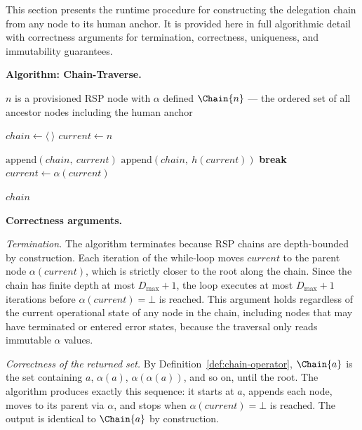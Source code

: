 This section presents the runtime procedure for constructing the delegation chain from any node to its human anchor. It is provided here in full algorithmic detail with correctness arguments for termination, correctness, uniqueness, and immutability guarantees.

\medskip
\noindent\textbf{Algorithm: Chain-Traverse.}

\begin{algorithm}
\caption{Chain-Traverse($n$) --- Build the delegation chain from node $n$ to the human anchor}
\label{alg:chain-traverse}
\begin{algorithmic}[1]
\REQUIRE $n$ is a provisioned RSP node with $\alpha$ defined
\ENSURE $\Chain{n}$ --- the ordered set of all ancestor nodes including the human anchor

\STATE $chain \leftarrow \langle\ \rangle$ 
\STATE $current \leftarrow n$ 

    \STATE $\mathrm{append}(chain,\ current)$ 
        \STATE $\mathrm{append}(chain,\ h(current))$ 
        \STATE \textbf{break}
    \ENDIF
    \STATE $current \leftarrow \alpha(current)$ 
\ENDWHILE

\RETURN $chain$
\end{algorithmic}
\end{algorithm}

\medskip
\noindent\textbf{Correctness arguments.}

\textit{Termination.} The algorithm terminates because RSP chains are depth-bounded by construction. Each iteration of the while-loop moves $current$ to the parent node $\alpha(current)$, which is strictly closer to the root along the chain. Since the chain has finite depth at most $D_{\max} + 1$, the loop executes at most $D_{\max} + 1$ iterations before $\alpha(current) = \bot$ is reached. This argument holds regardless of the current operational state of any node in the chain, including nodes that may have terminated or entered error states, because the traversal only reads immutable $\alpha$ values.

\textit{Correctness of the returned set.} By Definition~\ref{def:chain-operator}, $\Chain{a}$ is the set containing $a$, $\alpha(a)$, $\alpha(\alpha(a))$, and so on, until the root. The algorithm produces exactly this sequence: it starts at $a$, appends each node, moves to its parent via $\alpha$, and stops when $\alpha(current) = \bot$ is reached. The output is identical to $\Chain{a}$ by construction.

